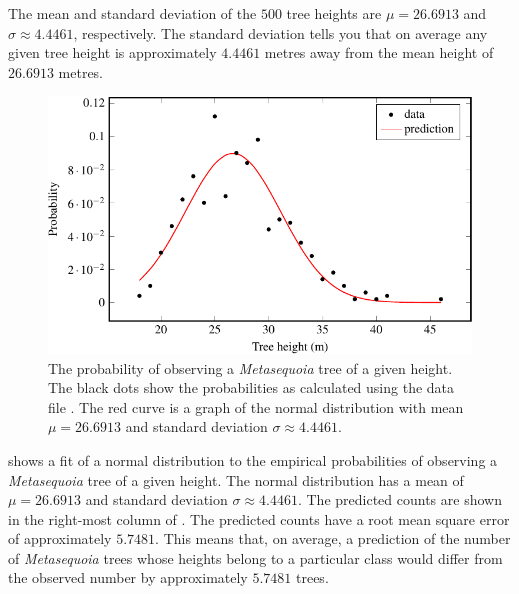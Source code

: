 \documentclass[a4paper,oneside,12pt]{article}
\begin{document}
\begin{problem}
{\begin{solution}
\begin{table}[!htbp]
\centering

\caption{%
  The probability of each height class for $n = 500$
  \emph{Metasequoia} trees.  Given a class $x$, the corresponding
  count $c$ is the number of height measurements $h$ such that
  $x - 1 \leq h < x$.  The observed probability for the class $x$ is
  $c / n$.  The predicted probability is $P(x)$ as defined by the
  normal distribution in
   with a mean
  of $\mu = 26.6913$ and standard deviation $\sigma \approx 4.4461$.
  The predicted count for the class $x$ is $n \cdot P(x)$.
}
\label{tab:logarithm:Metaseqoia}
\end{table}

The mean and standard deviation of the $500$ tree heights are
$\mu = 26.6913$ and $\sigma \approx 4.4461$, respectively.  The
standard deviation tells you that on average any given tree height is
approximately $4.4461$ metres away from the mean height of $26.6913$
metres.

\begin{figure}[!htbp]
\centering
\includegraphics[scale=1.1]{image/12/metasequoia-probability.pdf}
\caption{%
  The probability of observing a \emph{Metasequoia} tree of a given
  height.  The black dots show the probabilities as calculated using
  the data file .  The red curve is a graph of
  the normal distribution with mean $\mu = 26.6913$ and standard
  deviation $\sigma \approx 4.4461$.
}
\label{fig:logarithm:Metasequoia_normal_distribution}
\end{figure}

 shows a fit of
a normal distribution to the empirical probabilities of observing a
\emph{Metasequoia} tree of a given height.  The normal distribution
has a mean of $\mu = 26.6913$ and standard deviation
$\sigma \approx 4.4461$.  The predicted counts are shown in the
right-most column of .  The predicted
counts have a root mean square error of approximately $5.7481$.  This
means that, on average, a prediction of the number of
\emph{Metasequoia} trees whose heights belong to a particular class
would differ from the observed number by approximately $5.7481$
trees.


\end{solution}}
\end{problem}
\end{document}
